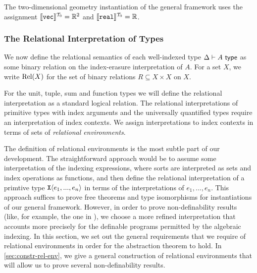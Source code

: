\begin{example}
  The two-dimensional geometry instantiation of the general framework
  uses the assignment $\llbracket \textup{\texttt{vec}} \rrbracket^{\mathcal{T}_0} = \mathbb{R}^2$ and
  $\llbracket \textup{\texttt{real}} \rrbracket^{\mathcal{T}_0} = \mathbb{R}$.
\end{example}

\subsubsection{The Relational Interpretation of Types}
\label{sec:relational-semantics}

We now define the relational semantics of each well-indexed type
$\Delta \vdash A \textsf{ type}$ as some binary relation on the index-erasure
interpretation of $A$. For a set $X$, we write $\mathrm{Rel}(X)$ for the set
of binary relations $R \subseteq X \times X$ on $X$.

For the unit, tuple, sum and function types we will define the
relational interpretation as a standard logical relation. The
relational interpretations of primitive types with index arguments and
the universally quantified types require an interpretation of index
contexts. We assign interpretations to index contexts in terms of sets
of \emph{relational environments}.

The definition of relational environments is the most subtle part of
our development. The straightforward approach would be to assume some
interpretation of the indexing expressions, where sorts are
interpreted as sets and index operations as functions, and then define
the relational interpretation of a primtive type
$\textup{\texttt{X}}\langle e_1,...,e_n \rangle$ in terms of the interpretations of
$e_1,...,e_n$. This approach suffices to prove free theorems and type
isomorphisms for instantiations of our general framework. However, in
order to prove non-definability results (like, for example, the one in
), we choose a more refined interpretation
that accounts more precisely for the definable programs permitted by
the algebraic indexing. In this section, we set out the general
requirements that we require of relational environments in order for
the abstraction theorem to hold. In \autoref{sec:constr-rel-env}, we
give a general construction of relational environments that will allow
us to prove several non-definability results.

